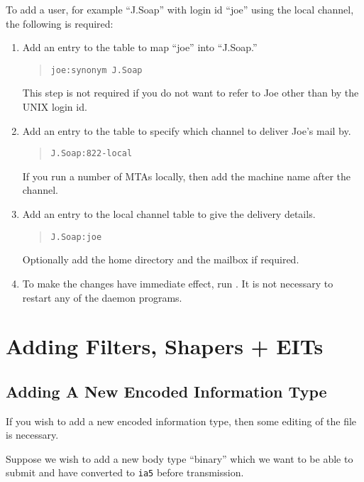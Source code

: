 To add a user, for example ``J.Soap'' with login id ``joe'' using
the local channel, the following is required:
\begin{enumerate}
\item	Add an entry to the  table to map ``joe'' into
``J.Soap.'' 
\begin{quote}\small\begin{verbatim}
joe:synonym J.Soap
\end{verbatim}\end{quote}
This step is not required if you do not want to refer to
Joe other than by the UNIX login id.

\item	Add an entry to the  table to specify which
channel to deliver Joe's mail by.
\begin{quote}\small\begin{verbatim}
J.Soap:822-local
\end{verbatim}\end{quote}
If you run a number of MTAs locally, then add the machine name after
the channel.

\item	Add an entry to the local channel table to give the delivery details.
\begin{quote}\small\begin{verbatim}
J.Soap:joe
\end{verbatim}\end{quote}
Optionally add the home directory and the mailbox if required.

\item	To make the changes have immediate effect, run .
It is not necessary to restart any of the daemon programs.
\end{enumerate}

\section {Adding Filters, Shapers + EITs}

\subsection{Adding A New Encoded Information Type}

If you wish to add a new encoded information type, then some editing
of the  file is necessary.

Suppose we wish to add a new body type ``binary'' which we want to be
able to submit and have converted to \verb|ia5| before transmission.

